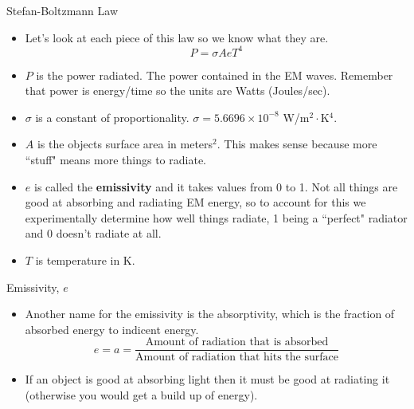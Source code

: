 \documentclass{beamer}
\begin{document}
\begin{frame}{Stefan-Boltzmann Law}
\begin{itemize}
   \item Let's look at each piece of this law so we know what they are.
   \begin{equation*}
      P = \sigma A e T^4
   \end{equation*}
   \item<2> \underline{$P$} is the power radiated. The power contained in the EM waves. Remember that power is energy/time so the units are Watts (Joules/sec).
   \item<3> \underline{$\sigma$} is a constant of proportionality. $\sigma = 5.6696 \times 10^{-8}$ W/m$^2\cdot$K$^4$.
   \item<4> \underline{$A$} is the objects surface area in meters$^2$. This makes sense because more ``stuff" means more things to radiate.
   \item<5> \underline{$e$} is called the {\bf emissivity} and it takes values from 0 to 1. Not all things are good at absorbing and radiating EM energy, so to account for this we experimentally determine how well things radiate, 1 being a ``perfect" radiator and 0 doesn't radiate at all.
   \item<6> \underline{$T$} is temperature in K.
\end{itemize}
\end{frame}

\begin{frame}{Emissivity, $e$}
\begin{itemize}
   \item Another name for the emissivity is the absorptivity, which is the fraction of absorbed energy to indicent energy.
   \begin{equation*}
      e = a = \frac{\text{Amount of radiation that is absorbed}}{\text{Amount of radiation that hits the surface}}
   \end{equation*}
   \item<2> If an object is good at absorbing light then it must be good at radiating it (otherwise you would get a build up of energy).
\end{itemize}
\end{frame}
\end{document}
